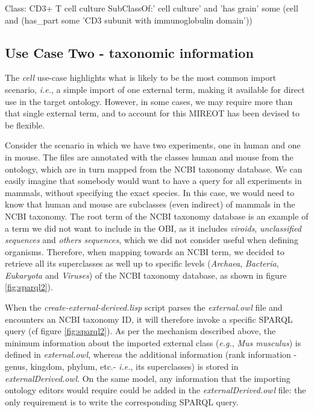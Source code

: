 \documentclass[jou]{ao2e}%
\begin{document}
\begin{footnotesize}
\begin{verbatimtab}
Class: CD3+ T cell culture
	SubClassOf:' cell culture'
			  and 'has grain' some (cell 
			  	and (has_part some 'CD3 subunit with immunoglobulin domain'))


\end{verbatimtab}
\end{footnotesize}

           


\subsection{Use Case Two - taxonomic information}

The \textit{cell} use-case highlights what is likely to be the most common import scenario, \emph{i.e.}, a simple import of one external term, making it available for direct use in the target ontology.
However, in some cases, we may require more than that single external term, and to account for this \ac{MIREOT} has been devised to be flexible.

Consider the scenario in which we have two experiments, one in human and one in mouse. 
The files are annotated with the classes human and mouse from the ontology, which are in turn mapped from the NCBI taxonomy database. 
We can easily imagine that somebody would want to have a query for all 
experiments in mammals, without specifying the exact species. In this case, we would need to know that human and mouse are 
subclasses (even indirect) of mammals in the NCBI taxonomy. The root term of the NCBI taxonomy database is an example of a term we did not want to include in the \ac{OBI}, as it includes \textit{viroids}, \textit{unclassified sequences} and \textit{others sequences}, which we did not consider useful when defining organisms.  Therefore, when mapping 
towards an NCBI term, we decided to retrieve all its superclasses as well up to specific levels (\textit{Archaea}, \textit{Bacteria}, \textit{Eukaryota} and \textit{Viruses}) of the 
NCBI taxonomy database, as shown in figure \ref{fig:sparql2}).

When the \emph{create-external-derived.lisp} script parses the \emph{external.owl} file and encounters an NCBI taxonomy ID, it will therefore invoke a specific SPARQL query (cf figure \ref{fig:sparql2}). 
As per the mechanism described above, the minimum information about the imported external class (\emph{e.g.}, \emph{Mus musculus}) is defined in \emph{external.owl}, whereas the additional information (rank information - genus, kingdom, phylum, etc.- \emph{i.e.}, its  superclasses) is stored in \emph{ externalDerived.owl}.
On the same model, any information that the importing ontology editors would require could be added in the \emph{externalDerived.owl} file: the only requirement is to write the corresponding SPARQL query.
\end{document}
